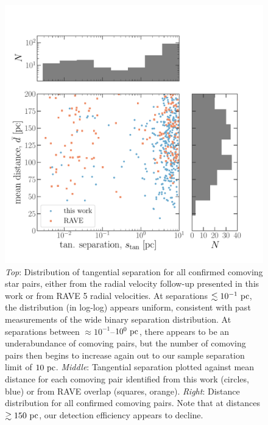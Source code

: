 \documentclass[modern, letterpaper]{aastex61}
\newcommand{\DR}[1]{\acronym{DR}#1}
\begin{document}
\begin{figure}[p]
  \begin{center}
    \includegraphics[width=\linewidth]{separation-with-rave.pdf}
  \end{center}
  \caption{%
    \emph{Top}: Distribution of tangential separation for all confirmed comoving
      star pairs, either from the radial velocity follow-up presented in this
      work or from RAVE \DR{5} radial velocities.
      At separations $\lesssim 10^{-1}~\mathrm{pc}$, the distribution (in log-log)
      appears uniform, consistent with past measurements of the wide binary
      separation distribution.
      At separations between $\approx 10^{-1}$--$10^{0}~\mathrm{pc}$, there appears to
      be an underabundance of comoving pairs, but the number of comoving pairs
      then begins to increase again out to our sample separation limit of
      $10~\mathrm{pc}$.
    \emph{Middle}: Tangential separation plotted against mean distance for each
      comoving pair identified from this work (circles, blue) or from RAVE
      overlap (squares, orange).
    \emph{Right}: Distance distribution for all confirmed comoving pairs.
      Note that at distances $\gtrsim 150~\mathrm{pc}$, our detection efficiency appears
      to decline.
    \label{fig:separation-RAVE}}
\end{figure}
\end{document}
